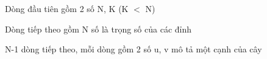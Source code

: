 Dòng đầu tiên gồm 2 số N, K (K $<$ N)  

   Dòng tiếp theo gồm N số là trọng số của các đỉnh  

   N-1 dòng tiếp theo, mỗi dòng gồm 2 số u, v mô tả một cạnh của cây